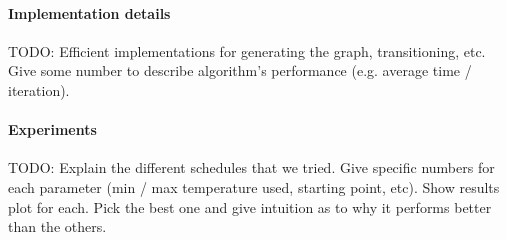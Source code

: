 \documentclass{report}
\begin{document}
  \paragraph{Implementation details}
  TODO: Efficient implementations for generating the graph, transitioning, etc. Give some number to describe algorithm's performance (e.g. average time / iteration).

  \paragraph{Experiments}
  TODO: Explain the different schedules that we tried. Give specific numbers for each parameter (min / max temperature used, starting point, etc). Show results plot for each. Pick the best one and give intuition as to why it performs better than the others.
\end{document}
